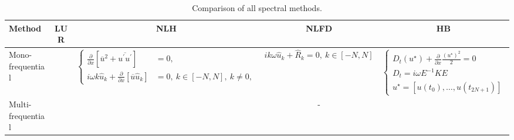 
\begin{sidewaystable}[htbp]
  \centering
  \begin{tabular}{l|c|c|c|c}
    \toprule
    Method & LUR & NLH & NLFD & HB \\
    \midrule
    Mono-frequential 
    &
    & $
    \begin{cases}
		\frac{\partial}{\partial x}
			\left[\overline{u}^2 + 
			\overline{u^\prime u^\prime}\right] &=
			0, \\
		i \omega k \widehat{u}_k + 
			\frac{\partial}{\partial x} 
			\left[ \overline{u} \widehat{u}_k\right] &= 
			0, \: k \in [-N, N], \: k \neq 0,
	\end{cases}
    $
    & $
	i k \omega \widehat{u}_k + \widehat{R}_k = 0, \: k \in [-N, N]
    $ 
    & $
    \begin{cases}
		D_t (u^\star) + 
		\frac{\partial}{\partial x}
		\frac{(u^\star)^2}{2} = 0 \\
		D_t = i \omega E^{-1} K E \\
		u^\star = [u(t_0), \ldots, u(t_{2N+1})]
	\end{cases}
    $\\
    \midrule
    Multi-frequential 
    &
    &
    & - 
    &$
    $\\
  \end{tabular}
  \caption{Comparison of all spectral methods.}
  \label{tab:sm_comparison_spectral_methods}
\end{sidewaystable} 